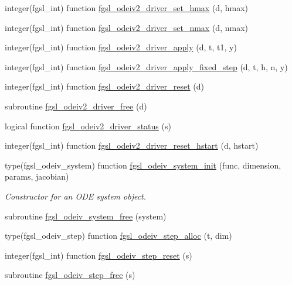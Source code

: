 \begin{DoxyCompactItemize}
\item 
integer(fgsl\-\_\-int) function \hyperlink{ode_8finc_a524a858cffa85f419e05e2da0a21f813}{fgsl\-\_\-odeiv2\-\_\-driver\-\_\-set\-\_\-hmax} (d, hmax)
\item 
integer(fgsl\-\_\-int) function \hyperlink{ode_8finc_a672eeb10000330826020da95ce99c391}{fgsl\-\_\-odeiv2\-\_\-driver\-\_\-set\-\_\-nmax} (d, nmax)
\item 
integer(fgsl\-\_\-int) function \hyperlink{ode_8finc_a6cd36ae8668cd6a69d3d8b4200df210d}{fgsl\-\_\-odeiv2\-\_\-driver\-\_\-apply} (d, t, t1, y)
\item 
integer(fgsl\-\_\-int) function \hyperlink{ode_8finc_a9eedde9d2faadc18f0d952e48b364f04}{fgsl\-\_\-odeiv2\-\_\-driver\-\_\-apply\-\_\-fixed\-\_\-step} (d, t, h, n, y)
\item 
integer(fgsl\-\_\-int) function \hyperlink{ode_8finc_abf08671d0ef862295d6bf5fd2b9733b2}{fgsl\-\_\-odeiv2\-\_\-driver\-\_\-reset} (d)
\item 
subroutine \hyperlink{ode_8finc_a1bd2c2d5a3b6758b0a2bf84c64e14c49}{fgsl\-\_\-odeiv2\-\_\-driver\-\_\-free} (d)
\item 
logical function \hyperlink{ode_8finc_af058bdba2f220e7f306c7dac6fefc7e8}{fgsl\-\_\-odeiv2\-\_\-driver\-\_\-status} (s)
\item 
integer(fgsl\-\_\-int) function \hyperlink{ode_8finc_a8428de6bbc5fb897c3795b911a805435}{fgsl\-\_\-odeiv2\-\_\-driver\-\_\-reset\-\_\-hstart} (d, hstart)
\item 
type(fgsl\-\_\-odeiv\-\_\-system) function \hyperlink{ode_8finc_ac5419ee4b9617d0020895e1f452e0ec8}{fgsl\-\_\-odeiv\-\_\-system\-\_\-init} (func, dimension, params, jacobian)
\begin{DoxyCompactList}\small\item\em Constructor for an O\-D\-E system object. \end{DoxyCompactList}\item 
subroutine \hyperlink{ode_8finc_a4fad8d181c7842450901cd34bf9902c5}{fgsl\-\_\-odeiv\-\_\-system\-\_\-free} (system)
\item 
type(fgsl\-\_\-odeiv\-\_\-step) function \hyperlink{ode_8finc_ad80515e2f8704ae9c376357ff184c0b5}{fgsl\-\_\-odeiv\-\_\-step\-\_\-alloc} (t, dim)
\item 
integer(fgsl\-\_\-int) function \hyperlink{ode_8finc_a550b05385e72fdf0e9c8febe9d9c0556}{fgsl\-\_\-odeiv\-\_\-step\-\_\-reset} (s)
\item 
subroutine \hyperlink{ode_8finc_ae2d74056a3dd23aaf31cd48dd757a987}{fgsl\-\_\-odeiv\-\_\-step\-\_\-free} (s)

\end{DoxyCompactItemize}
